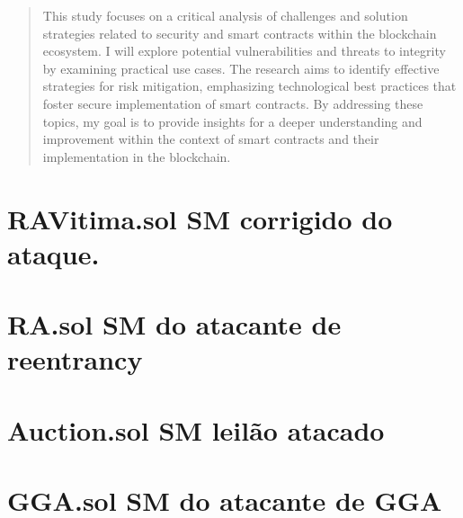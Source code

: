 \documentclass[portuguese,oneside]{UFFStex}
\begin{document}
\begin{abstract}
This study focuses on a critical analysis of challenges and solution strategies related to security and smart contracts within the blockchain ecosystem. I will explore potential vulnerabilities and threats to integrity by examining practical use cases. The research aims to identify effective strategies for risk mitigation, emphasizing technological best practices that foster secure implementation of smart contracts. By addressing these topics, my goal is to provide insights for a deeper understanding and improvement within the context of smart contracts and their implementation in the blockchain. 
\end{abstract}

\listoffigures       %
\listofacronyms      %
\tableofcontents     %










\anexos
\chapter{RAVitima.sol SM corrigido do ataque.}
\chapter{RA.sol SM do atacante de reentrancy}
\chapter{Auction.sol SM leilão atacado}
\chapter{GGA.sol SM do atacante de GGA}
\end{document}
